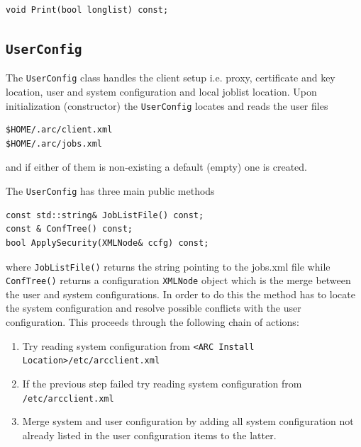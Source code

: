 \documentclass{book}
\newcommand{\UserConfig}{\texttt{UserConfig}}
\newcommand{\XMLNode}{\texttt{XMLNode}}
\begin{document}
\begin{shaded}
\begin{verbatim}
void Print(bool longlist) const;
\end{verbatim}
\end{shaded}

\subsection{{\UserConfig}}

The {\UserConfig} class handles the client setup i.e. proxy,
certificate and key location, user and system configuration and local
joblist location. Upon initialization (constructor) the {\UserConfig}
locates and reads the user files

\begin{shaded}
\begin{verbatim}
$HOME/.arc/client.xml
$HOME/.arc/jobs.xml
\end{verbatim}
\end{shaded}

and if either of them is non-existing a default (empty) one is created.

The {\UserConfig} has three main public methods

\begin{shaded}
\begin{verbatim}
const std::string& JobListFile() const;
const & ConfTree() const;
bool ApplySecurity(XMLNode& ccfg) const;
\end{verbatim}
\end{shaded}

where \texttt{JobListFile()} returns the string pointing to the
jobs.xml file while \texttt{ConfTree()} returns a configuration
{\XMLNode} object which is the merge between the user and system
configurations. In order to do this the method has to locate the
system configuration and resolve possible conflicts with the user
configuration. This proceeds through the following chain of actions:

\begin{enumerate}
\item{Try reading system configuration from \texttt{<ARC Install
    Location>/etc/arcclient.xml}}
\item{If the previous step failed try reading system configuration
  from \texttt{/etc/arcclient.xml}}
\item{Merge system and user configuration by adding all system
  configuration not already listed in the user configuration items to the
  latter.}
\end{enumerate}
\end{document}
